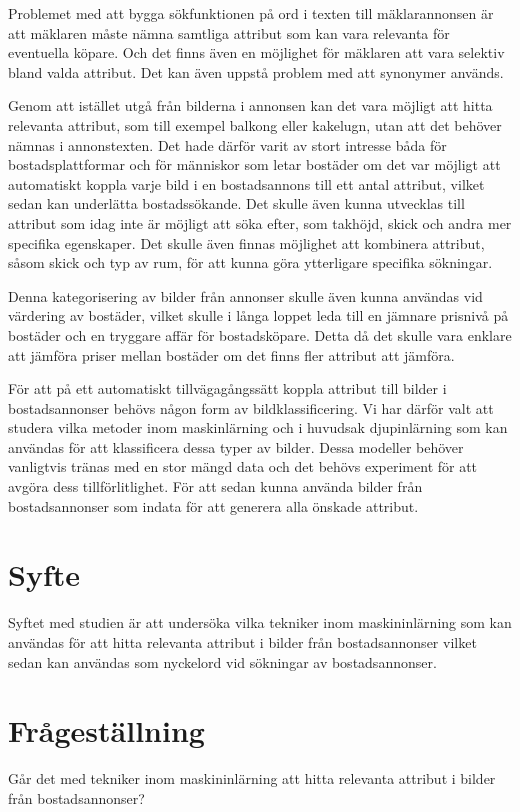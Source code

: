 \documentclass[]{kththesis}
\begin{document}
Problemet med att bygga sökfunktionen på ord i texten till mäklarannonsen är att mäklaren måste nämna samtliga attribut som kan vara relevanta för eventuella köpare. Och det finns även en möjlighet för mäklaren att vara selektiv bland valda attribut. Det kan även uppstå problem med att synonymer används.

Genom att istället utgå från bilderna i annonsen kan det vara möjligt att hitta relevanta attribut, som till exempel balkong eller kakelugn, utan att det behöver nämnas i annonstexten. Det hade därför varit av stort intresse båda för bostadsplattformar och för människor som letar bostäder om det var möjligt att automatiskt koppla varje bild i en bostadsannons till ett antal attribut, vilket sedan kan underlätta bostadssökande. Det skulle även kunna utvecklas till attribut som idag inte är möjligt att söka efter, som takhöjd, skick och andra mer specifika egenskaper. Det skulle även finnas möjlighet att kombinera attribut, såsom skick och typ av rum, för att kunna göra ytterligare specifika sökningar.

Denna kategorisering av bilder från annonser skulle även kunna användas vid värdering av bostäder, vilket skulle i långa loppet leda till en jämnare prisnivå på bostäder och en tryggare affär för bostadsköpare. Detta då det skulle vara enklare att jämföra priser mellan bostäder om det finns fler attribut att jämföra.

För att på ett automatiskt tillvägagångssätt koppla attribut till bilder i bostadsannonser behövs någon form av bildklassificering. Vi har därför valt att studera vilka metoder inom maskinlärning och i huvudsak djupinlärning som kan användas för att klassificera dessa typer av bilder. Dessa modeller behöver vanligtvis tränas med en stor mängd data och det behövs experiment för att avgöra dess tillförlitlighet. För att sedan kunna använda bilder från bostadsannonser som indata för att generera alla önskade attribut.

\section{Syfte}
Syftet med studien är att undersöka vilka tekniker inom maskininlärning som kan användas för att hitta relevanta attribut i bilder från bostadsannonser vilket sedan kan användas som nyckelord vid sökningar av bostadsannonser.

\section{Frågeställning}
Går det med tekniker inom maskininlärning att hitta relevanta attribut i bilder från bostadsannonser?
\end{document}
